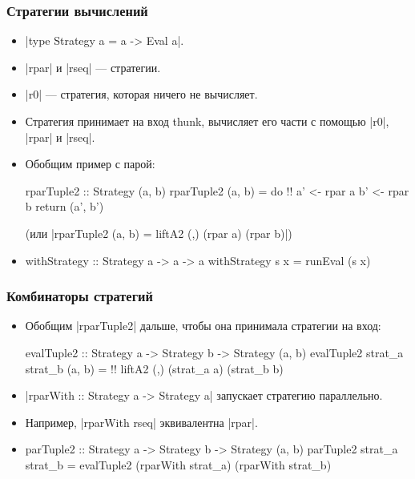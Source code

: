 \documentclass[11pt]{beamer}
\begin{document}
\begin{frame}[fragile]
  \frametitle{Стратегии вычислений}
  \begin{itemize}
    \item \haskinline|type Strategy a = a -> Eval a|.
    \item \haskinline|rpar| и \haskinline|rseq| --- стратегии.
    \item \haskinline|r0| --- стратегия, которая ничего не вычисляет.
    \item Стратегия принимает на вход thunk, вычисляет его части с помощью \haskinline|r0|, \haskinline|rpar| и \haskinline|rseq|.
    \item Обобщим пример с парой:
          \begin{haskell}
            rparTuple2 :: Strategy (a, b)
            rparTuple2 (a, b) = do !\pause!
              a' <- rpar a
              b' <- rpar b
              return (a', b')
          \end{haskell}
          \pause
          (или \haskinline[fontsize=\small]|rparTuple2 (a, b) = liftA2 (,) (rpar a) (rpar b)|)
    \item
          \begin{haskell}
withStrategy :: Strategy a -> a -> a
withStrategy s x = runEval (s x)
\end{haskell}
  \end{itemize}
\end{frame}

\begin{frame}[fragile]
  \frametitle{Комбинаторы стратегий}
  \begin{itemize}
    \item Обобщим \haskinline|rparTuple2| дальше, чтобы она принимала стратегии на вход:
          \begin{haskell}
            evalTuple2 :: Strategy a -> Strategy b -> 
              Strategy (a, b)
            evalTuple2 strat_a strat_b (a, b) = !\pause! 
              liftA2 (,) (strat_a a) (strat_b b)
          \end{haskell}
          \pause
    \item \haskinline|rparWith :: Strategy a -> Strategy a| запускает стратегию параллельно.
    \item Например, \haskinline|rparWith rseq| эквивалентна \haskinline|rpar|.
          \pause
    \item
          \begin{haskell}
            parTuple2 :: Strategy a -> Strategy b -> 
              Strategy (a, b)
            parTuple2 strat_a strat_b = 
              evalTuple2 (rparWith strat_a) (rparWith strat_b)
          \end{haskell}
  \end{itemize}
\end{frame}
\end{document}

